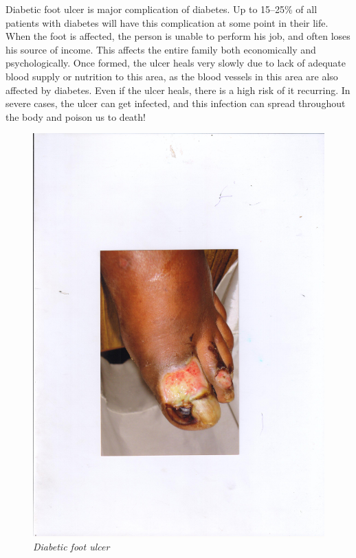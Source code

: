 
Diabetic foot ulcer is major complication of diabetes. Up to 15–25\% of all patients with diabetes will have this complication at some point in their life. When the foot is affected, the person is unable to perform his job, and often loses his source of income. This affects the entire family both economically and psychologically. Once formed, the ulcer heals very slowly due to lack of adequate blood supply or nutrition to this area, as the blood vessels in this area are also affected by diabetes. Even if the ulcer heals, there is a high risk of it recurring.  In severe cases, the ulcer can get infected, and this infection can spread throughout the body and poison us to death!

\begin{figure}
\includegraphics{images/058.jpg}
\caption{\textit{Diabetic foot ulcer}}
\end{figure}



